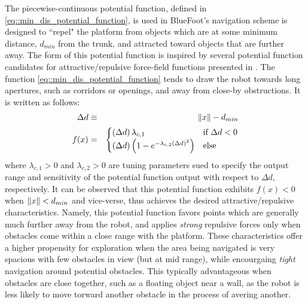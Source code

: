 			The piecewise-continuous potential function, defined in \ref{eq::min_dis_potential_function}, is used in BlueFoot's navigation scheme is designed to ``repel" the platform from objects which are at some minimum distance, $d_{min}$ from the trunk, and attracted toward objects that are further away. The form of this potential function is inspired by several potential function candidates for attractive/repulsive force-field functions presented in \cite{ArambulaCosio2004}. The function \ref{eq::min_dis_potential_function} tends to draw the robot towards long apertures, such as corridors or openings, and away from close-by obstructions. It is written as follows:
				\begin{eqnarray}
					\Delta d &\equiv& \left\lVert x\right\rVert-d_{min} \nonumber \\
					f(x) &=& 
					\begin{cases}	
					 	\left(\Delta d\right) \lambda_{c,1}	&  \text{if } \Delta d < 0 \\
										\left(\Delta d\right) \left( 1  - e^{ -  \lambda_{c,2} { \left(\Delta d\right) }^{2} } \right) 	&  \text{else}
					\end{cases}
				\label{eq::min_dis_potential_function}
				\end{eqnarray}
			where $\lambda_{c,1}>0$ and $\lambda_{c,2}>0$ are tuning parameters sued to specify the output range and sensitivity of the potential function output with respect to $\Delta d$, respectively. It can be observed that this potential function exhibits $f(x)<0$ when $\left\lVert x\right\rVert < d_{min}$ and vice-verse, thus achieves the desired attractive/repulsive characteristics. Namely, this potential function favors points which are generally much further away from the robot, and applies \emph{strong} repulsive forces only when obstacles come within a close range with the platform. These characteristics offer a higher propensity for exploration when the area being navigated is very spacious with few obstacles in view (but at mid range), while encourgaing \emph{tight} navigation around potential obstacles. This typically advantageous when obstacles are close together, such as a floating object near a wall, as the robot is less likely to move torward another obstacle in the process of avering another.  

